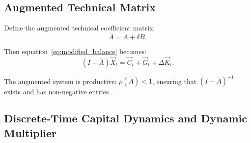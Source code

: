 \subsection{Augmented Technical Matrix}

\begin{definition}
\label{def:augmented}
Define the augmented technical coefficient matrix:
\begin{equation}\label{eq:A_bar}
    \bar{A} = A + \delta B.
\end{equation}
\end{definition}
%
Then equation~\eqref{eq:modified_balance} becomes:
%
\begin{equation}\label{eq:augmented_balance}
    (I - \bar{A})\vec{X}_t = \vec{C}_t + \vec{G}_{t} + \Delta \vec{K}_t.
\end{equation}

\begin{assumption}
\label{ass:productivity}
The augmented system is productive: $\rho(\bar{A}) < 1$, ensuring that
$(I - \bar{A})^{-1}$ exists and has non-negative entries
\citep{nikaido1970introduction}.
\end{assumption}

\subsection{Discrete-Time Capital Dynamics and Dynamic Multiplier}

